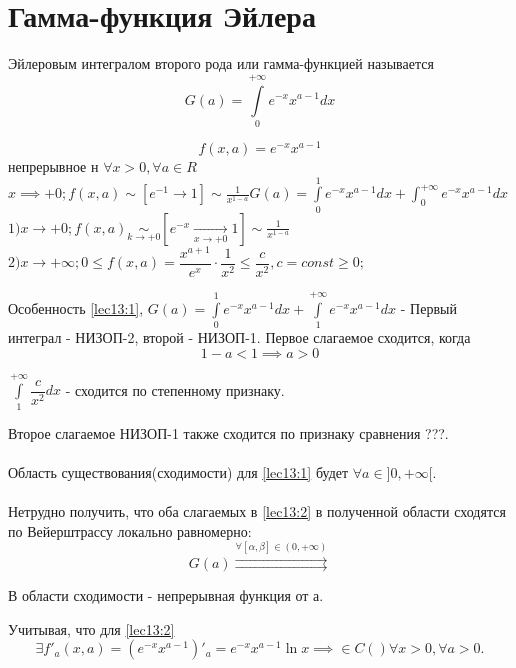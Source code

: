 \documentclass[../../main.tex]{subfiles}
\begin{document}

\section{Гамма-функция Эйлера}

Эйлеровым интегралом второго рода или гамма-функцией называется
\begin{equation}
\label{lec13:1}
G(a) = \int\limits_0^{+\infty}e^{-x}x^{a-1}dx
\end{equation}

\[
	f(x, a) = e^{-x}x^{a-1}
\]  непрерывное н $\forall x > 0, \forall a \in R$
\\
$
	x \implies +0; f(x, a) \sim [e^{-1} \to 1] \sim \frac{1}{x^{1-a}}
	G(a) = \int\limits_0^1e^{-x}x^{a-1}dx + \int_0^{+\infty}e^{-x}x^{a-1}dx
$
\\
$
1) x \to + 0; f(x, a) \underset{k \to +0}\sim \left[ e^{-x} 
\underset{x \to +0} \to 1 \right] \sim \frac{1}{x^{1-a}}
$
\\
$
	2) x \to +\infty; 
	0 \le f(x, a) = \dfrac{x^{a+1}}{e^x} \cdot \dfrac{1}{x^2} \le \dfrac{c}{x^2}, c=const \ge 0;
$

Особенность \eqref{lec13:1}, $G(a) = \int\limits_0^1 e^{-x} x^{a-1} dx +
\int\limits_1^{+\infty} e^{-x} x^{a-1} dx $ - 
Первый интеграл - НИЗОП-2, второй - НИЗОП-1. 
Первое слагаемое сходится, когда \begin{equation}
	\label{lec13:2}
	1 - a < 1 \implies a > 0
\end{equation}

$\int\limits_1^{+\infty}\dfrac{c}{x^2}dx$ - сходится по степенному признаку.

Второе слагаемое НИЗОП-1 также сходится по признаку сравнения ???.
\\\\
Область существования(сходимости) для \eqref{lec13:1} будет $\forall a \in ]0, +\infty[$.
\\\\
Нетрудно получить, что оба слагаемых в \eqref{lec13:2} в полученной области сходятся по Вейерштрассу локально равномерно:
\[
G(a) \overset{\forall \left[ \alpha, \beta \right] \in (0, +\infty)}{\rightrightarrows}
\]

В области сходимости - непрерывная функция от а.

Учитывая, что для \eqref{lec13:2}
\[
\exists f'_a(x, a) = (e^{-x} x^{a-1})'_a = e^{-x}x^{a-1} \ln x \implies \in C() \forall x > 0, \forall a > 0.
\]
\end{document}
